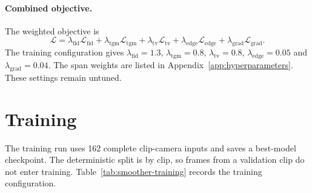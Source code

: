 \paragraph{Combined objective.}
\label{sec:smoother-combined}

The weighted objective is
\[
    \mathcal{L}
      =\lambda_{\mathrm{fid}}\mathcal{L}_{\mathrm{fid}}
       +\lambda_{\mathrm{tgm}}\mathcal{L}_{\mathrm{tgm}}
       +\lambda_{\mathrm{tv}}\mathcal{L}_{\mathrm{tv}}
       +\lambda_{\mathrm{edge}}\mathcal{L}_{\mathrm{edge}}
       +\lambda_{\mathrm{grad}}\mathcal{L}_{\mathrm{grad}}.
\]
The training configuration gives $\lambda_{\mathrm{fid}}=1.3$, $\lambda_{\mathrm{tgm}}=0.8$,
$\lambda_{\mathrm{tv}}=0.8$, $\lambda_{\mathrm{edge}}=0.05$ and
$\lambda_{\mathrm{grad}}=0.04$. The span weights are listed in Appendix~\ref{app:hyperparameters}. These settings remain untuned.


\section{Training}
\label{sec:smoother-training}

The training run uses 162 complete clip-camera inputs and saves a
best-model checkpoint. The deterministic split is by clip, so frames from a validation clip do not
enter training. Table~\ref{tab:smoother-training} records the training configuration.


